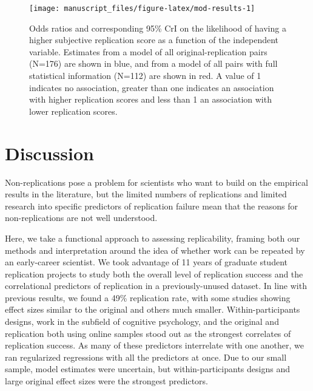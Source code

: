 \documentclass[
  english,
  a4paper,
]{article}
\begin{document}
\begin{figure}[ht]
\texttt{[image: manuscript\_files/figure-latex/mod-results-1]} \caption{Odds ratios and corresponding 95\% CrI on the likelihood of having a higher subjective replication score as a function of the independent variable. Estimates from a model of all original-replication pairs (N=176) are shown in blue, and from a model of all pairs with full statistical information (N=112) are shown in red. A value of 1 indicates no association, greater than one indicates an association with higher replication scores and less than 1 an association with lower replication scores.}\label{fig:mod-results}
\end{figure}

\hypertarget{discussion}{%
\section{Discussion}\label{discussion}}

Non-replications pose a problem for scientists who want to build on the empirical results in the literature, but the limited numbers of replications and limited research into specific predictors of replication failure mean that the reasons for non-replications are not well understood.

Here, we take a functional approach to assessing replicability, framing both our methods and interpretation around the idea of whether work can be repeated by an early-career scientist. We took advantage of 11 years of graduate student replication projects to study both the overall level of replication success and the correlational predictors of replication in a previously-unused dataset. In line with previous results, we found a 49\% replication rate, with some studies showing effect sizes similar to the original and others much smaller. Within-participants designs, work in the subfield of cognitive psychology, and the original and replication both using online samples stood out as the strongest correlates of replication success. As many of these predictors interrelate with one another, we ran regularized regressions with all the predictors at once. Due to our small sample, model estimates were uncertain, but within-participants designs and large original effect sizes were the strongest predictors.
\end{document}
